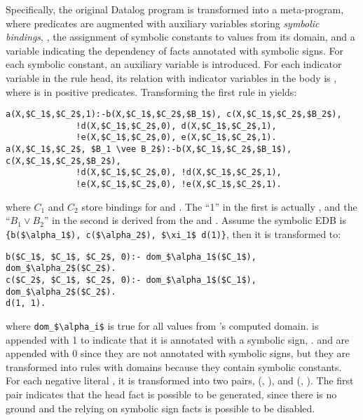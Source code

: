 \documentclass[acmsmall,screen,review,anonymous,nonacm]{acmart}
\begin{document}
Specifically, the original Datalog program is transformed into a meta-program, where predicates are augmented with auxiliary variables storing \emph{symbolic bindings}, \ie, the assignment of symbolic constants to values from its domain, and a variable indicating the dependency of facts annotated with symbolic signs.
For each symbolic constant, an auxiliary variable  is introduced.
For each indicator variable  in the rule head, its relation with indicator variables in the body is , where  is in positive predicates.
Transforming the first rule in  yields:
\begin{lstlisting}[mathescape, xleftmargin=0em, numbers=none, basicstyle=\footnotesize\ttfamily]
a(X,$C_1$,$C_2$,1):-b(X,$C_1$,$C_2$,$B_1$), c(X,$C_1$,$C_2$,$B_2$), 
              !d(X,$C_1$,$C_2$,0), d(X,$C_1$,$C_2$,1), 
              !e(X,$C_1$,$C_2$,0), e(X,$C_1$,$C_2$,1).
a(X,$C_1$,$C_2$, $B_1 \vee B_2$):-b(X,$C_1$,$C_2$,$B_1$), c(X,$C_1$,$C_2$,$B_2$), 
              !d(X,$C_1$,$C_2$,0), !d(X,$C_1$,$C_2$,1),
              !e(X,$C_1$,$C_2$,0), !e(X,$C_1$,$C_2$,1).
\end{lstlisting}
where $C_1$ and $C_2$ store bindings for  and . 
The ``1'' in the first  is actually , and the ``$B_1 \vee B_2$'' in the second  is derived from the  and .
Assume the symbolic EDB is \lstinline[mathescape]`{b($\alpha_1$), c($\alpha_2$), $\xi_1$ d(1)}`, then it is transformed to:
\begin{lstlisting}[mathescape, xleftmargin=0em, numbers=none, basicstyle=\footnotesize\ttfamily]
b($C_1$, $C_1$, $C_2$, 0):- dom_$\alpha_1$($C_1$), dom_$\alpha_2$($C_2$).
c($C_2$, $C_1$, $C_2$, 0):- dom_$\alpha_1$($C_1$), dom_$\alpha_2$($C_2$).  
d(1, 1).
\end{lstlisting}
where \lstinline[mathescape]`dom_$\alpha_i$` is true for all values from 's computed domain.
 is appended with 1 to indicate that it is annotated with a symbolic sign, .
 and  are appended with 0 since they are not annotated with symbolic signs, but they are transformed into rules with domains because they contain symbolic constants.
For each negative literal , it is transformed into two pairs, (, ), and (, ).
The first pair indicates that the head fact is possible to be generated, since there is no ground  and the  relying on symbolic sign facts is possible to be disabled.
\end{document}
